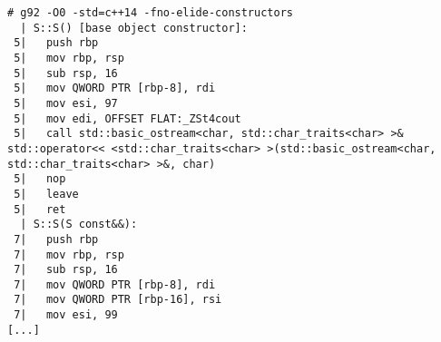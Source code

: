 \begin{lstlisting}[language={},numbers=none,title=\href{https://godbolt.org/z/7miZyk}{\texttt{godbolt.org/z/7miZyk}}]
# g92 -O0 -std=c++14 -fno-elide-constructors
  | S::S() [base object constructor]:
 5|   push rbp
 5|   mov rbp, rsp
 5|   sub rsp, 16
 5|   mov QWORD PTR [rbp-8], rdi
 5|   mov esi, 97
 5|   mov edi, OFFSET FLAT:_ZSt4cout
 5|   call std::basic_ostream<char, std::char_traits<char> >& std::operator<< <std::char_traits<char> >(std::basic_ostream<char, std::char_traits<char> >&, char)
 5|   nop
 5|   leave
 5|   ret
  | S::S(S const&&):
 7|   push rbp
 7|   mov rbp, rsp
 7|   sub rsp, 16
 7|   mov QWORD PTR [rbp-8], rdi
 7|   mov QWORD PTR [rbp-16], rsi
 7|   mov esi, 99
[...]
\end{lstlisting}
